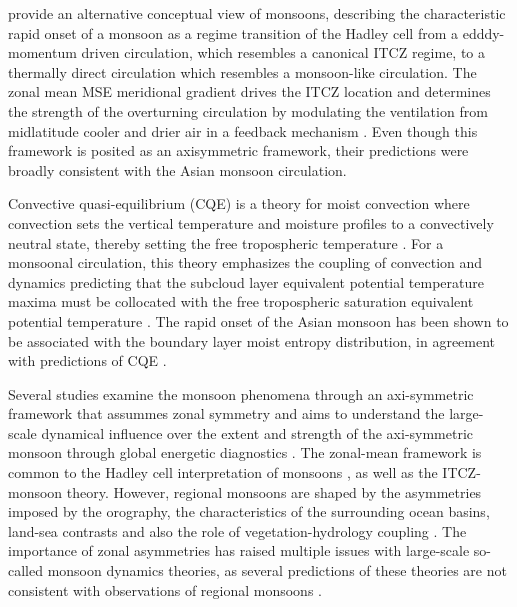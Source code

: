 \cite{bordoni2008monsoons} provide an alternative conceptual view of monsoons, describing the characteristic rapid onset of a monsoon as a regime transition of the Hadley cell from a edddy-momentum  driven circulation, which resembles a canonical ITCZ regime, to a thermally direct circulation which resembles a monsoon-like circulation. The zonal mean MSE meridional gradient drives the ITCZ location and determines the strength of the overturning circulation by modulating the ventilation from midlatitude cooler and drier air in a feedback mechanism \citep{geen2020}. Even though this framework is posited as an axisymmetric framework, their predictions were broadly consistent with the Asian monsoon circulation. 


Convective quasi-equilibrium (CQE) is a theory for moist convection where convection sets the vertical temperature and moisture profiles to a convectively neutral state, thereby setting the free tropospheric temperature \citep{neelin2007moist}. For a monsoonal circulation, this theory emphasizes the coupling of convection and dynamics predicting that the subcloud layer equivalent potential temperature maxima must be collocated with the free tropospheric saturation equivalent potential temperature \citep{nie2010observational,geen2020}. The rapid onset of the Asian monsoon has been shown to be associated with the boundary layer moist entropy distribution, in agreement with predictions of CQE \citep{nie2010observational,boos2015review,ma2019}.

Several studies examine the monsoon phenomena through an axi-symmetric framework that assummes zonal symmetry and aims to understand the large-scale dynamical influence over the extent and strength of the axi-symmetric monsoon through global energetic diagnostics \citep[e.g.][]{faulk2017effects,geen2019,byrne2020}. The zonal-mean framework is common to the Hadley cell interpretation of monsoons \citep{bordoni2008monsoons}, as well as the ITCZ-monsoon theory. %
However, regional monsoons are shaped by the asymmetries imposed by the orography, the characteristics of the surrounding ocean basins, land-sea contrasts and also the role of vegetation-hydrology coupling \citep{wang2017,pascale2019}. 
The importance of zonal asymmetries has raised multiple issues with large-scale so-called monsoon dynamics theories, as several predictions of these theories are not consistent with observations of regional monsoons \citep[e.g.][]{nie2010observational,smyth2018simulated,biasutti2018global,pascale2019}. 


